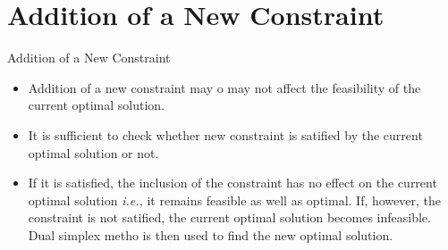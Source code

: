 \section{Addition of a New Constraint}
\label{sec:addition-new-constraint}

\begin{frame}{Addition of a New Constraint}
  \begin{itemize} \justifying \parskip4mm
    \item Addition of a new constraint may o may not affect the feasibility of the current optimal solution.
    \item It is sufficient to check whether new constraint is satified by the current optimal solution or not.
    \item If it is satisfied, the inclusion of the constraint has no effect on the current optimal solution \emph{i.e.,} it remains feasible as well as optimal. If, however, the constraint is not satified, the current \alert{optimal solution becomes infeasible. Dual simplex metho is then used to find the new optimal solution.}
  \end{itemize}
\end{frame}

